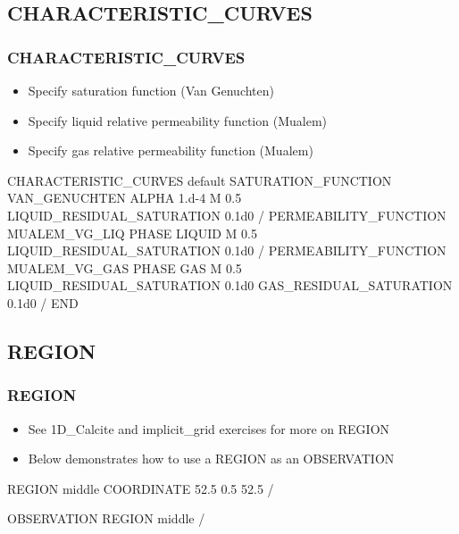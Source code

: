 \documentclass{beamer}
\begin{document}
\subsection{CHARACTERISTIC\_CURVES}

\begin{frame}\frametitle{CHARACTERISTIC\_CURVES}

\begin{itemize}
  \item Specify saturation function (Van Genuchten)
  \item Specify liquid relative permeability function (Mualem)
  \item Specify gas relative permeability function (Mualem)
\end{itemize}

\begin{semiverbatim}

CHARACTERISTIC_CURVES default
  SATURATION_FUNCTION VAN_GENUCHTEN
    ALPHA 1.d-4
    M 0.5
    LIQUID_RESIDUAL_SATURATION 0.1d0
  /
  PERMEABILITY_FUNCTION MUALEM_VG_LIQ
    PHASE LIQUID
    M 0.5
    LIQUID_RESIDUAL_SATURATION 0.1d0
  /
  PERMEABILITY_FUNCTION MUALEM_VG_GAS
    PHASE GAS
    M 0.5
    LIQUID_RESIDUAL_SATURATION 0.1d0
    GAS_RESIDUAL_SATURATION 0.1d0
  /
END
\end{semiverbatim}

\end{frame}

\subsection{REGION}

\begin{frame}[fragile]\frametitle{REGION}
\begin{itemize}
  \item{See 1D_Calcite and implicit_grid exercises for more on REGION}
  \item{Below demonstrates how to use a REGION as an OBSERVATION}
\end{itemize}

\begin{semiverbatim}
REGION middle
  COORDINATE 52.5 0.5 52.5
/

OBSERVATION
  REGION middle
/

\end{semiverbatim}

\end{frame}
\end{document}
